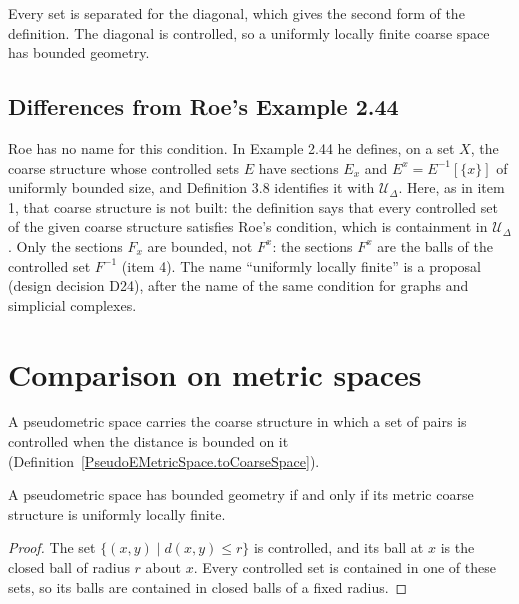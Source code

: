 Every set is separated for the diagonal, which gives the second form of the definition. The
diagonal is controlled, so a uniformly locally finite coarse space has bounded geometry.

\subsection*{Differences from Roe's Example 2.44}

Roe has no name for this condition. In Example 2.44 he defines, on a set $X$, the coarse
structure whose controlled sets $E$ have sections $E_x$ and $E^x = E^{-1}[\{x\}]$ of uniformly
bounded size, and Definition 3.8 identifies it with $\mathcal{U}_\Delta$. Here, as in item 1,
that coarse structure is not built: the definition says that every controlled set of the given
coarse structure satisfies Roe's condition, which is containment in $\mathcal{U}_\Delta$.
Only the sections $F_x$ are bounded, not $F^x$: the sections $F^x$ are the balls of the
controlled set $F^{-1}$ (item 4). The name ``uniformly locally finite'' is a proposal (design
decision D24), after the name of the same condition for graphs and simplicial complexes.

\section*{Comparison on metric spaces}

A pseudometric space carries the coarse structure in which a set of pairs is controlled when
the distance is bounded on it
(Definition~\ref{PseudoEMetricSpace.toCoarseSpace}).

\begin{lemma}[cf.\ Roe Ex.~3.14]
  \label{Metric.hasBoundedGeometry_iff_isUniformlyLocallyFinite}
  A pseudometric space has bounded geometry if and only if its metric coarse structure is
  uniformly locally finite.
\end{lemma}
\begin{proof}
  The set $\{(x, y) \mid d(x, y) \le r\}$ is controlled, and its ball at $x$ is the closed ball
  of radius $r$ about $x$. Every controlled set is contained in one of these sets, so its balls
  are contained in closed balls of a fixed radius.
\end{proof}

